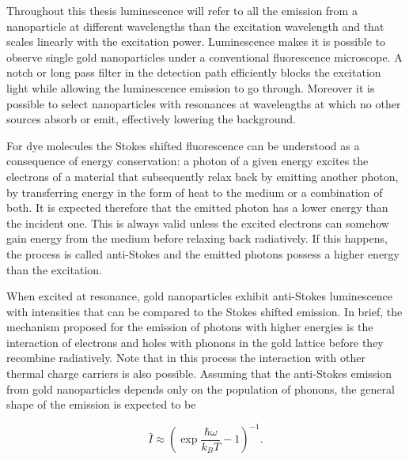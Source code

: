 Throughout this thesis luminescence will refer to all the emission from a
nanoparticle at different wavelengths than the excitation wavelength and that
scales linearly with the excitation power. Luminescence makes it is possible to
observe single gold nanoparticles under a conventional fluorescence microscope.
A notch or long pass filter in the detection path efficiently blocks the
excitation light while allowing the luminescence emission to go through.
Moreover it is possible to select nanoparticles with resonances at wavelengths
at which no other sources absorb or emit, effectively lowering the background.


For dye molecules the Stokes shifted fluorescence can be understood as a
consequence of energy conservation: a photon of a given energy excites the
electrons of a material that subsequently relax back by emitting another photon,
by transferring energy in the form of heat to the medium or a combination of
both. It is expected therefore that the emitted photon has a lower energy than
the incident one. This is always valid unless the excited electrons can somehow
gain energy from the medium before relaxing back radiatively. If this happens,
the process is called anti-Stokes and the emitted photons possess a higher
energy than the excitation.

When excited at resonance, gold nanoparticles exhibit anti-Stokes luminescence
with intensities that can be compared to the Stokes shifted emission. In brief,
the mechanism proposed for the emission of photons with higher energies is the
interaction of electrons and holes with phonons in the gold lattice before they
recombine radiatively. Note that in this process the interaction with other
thermal charge carriers is also possible. Assuming that the anti-Stokes emission
from gold nanoparticles depends only on the population of phonons, the general
shape of the emission is expected to be

\begin{equation}\label{eqn:antiStokes}
	\bar{I}\approx\left(\exp\frac{\hbar\omega}{k_BT}-1\right)^{-1}.
\end{equation}

